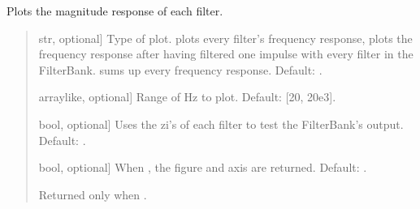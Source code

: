 \documentclass[letterpaper,10pt,english]{sphinxmanual}
\begin{document}
\begin{fulllineitems}
\begin{fulllineitems}
\label{\detokenize{classes:dsptools.classes.filterbank.FilterBank.plot_magnitude}}
\pysigstartsignatures
{}
\pysigstopsignatures
\sphinxAtStartPar
Plots the magnitude response of each filter.
\begin{quote}\begin{description}
\begin{description}
\sphinxlineitem{\sphinxstylestrong{mode}}{[}str, optional{]}
\sphinxAtStartPar
Type of plot.  plots every filter’s frequency response,
 plots the frequency response after having filtered
one impulse with every filter in the FilterBank. 
sums up every frequency response. Default: .

\sphinxlineitem{\sphinxstylestrong{range\_hz}}{[}array\sphinxhyphen{}like, optional{]}
\sphinxAtStartPar
Range of Hz to plot. Default: {[}20, 20e3{]}.

\sphinxlineitem{\sphinxstylestrong{test\_zi}}{[}bool, optional{]}
\sphinxAtStartPar
Uses the zi’s of each filter to test the FilterBank’s output.
Default: .

\sphinxlineitem{\sphinxstylestrong{returns}}{[}bool, optional{]}
\sphinxAtStartPar
When , the figure and axis are returned. Default: .

\end{description}

\begin{description}
\sphinxAtStartPar
Returned only when .


\end{description}
\end{description}
\end{quote}
\end{fulllineitems}
\end{fulllineitems}
\end{document}
